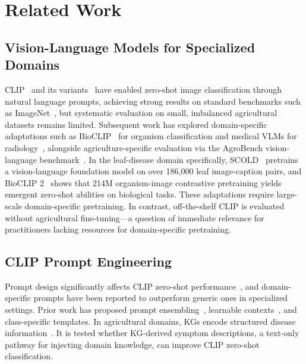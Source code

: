 \documentclass[10pt,a4paper]{article}
\begin{document}
\section{Related Work}
\label{sec:related}

\subsection{Vision-Language Models for Specialized Domains}

CLIP~\cite{radford2021learning} and its variants~\cite{cherti2023reproducible,zhai2023sigmoid} have enabled zero-shot image classification through natural language prompts, achieving strong results on standard benchmarks such as ImageNet~\cite{deng2009imagenet}, but systematic evaluation on small, imbalanced agricultural datasets remains limited.
Subsequent work has explored domain-specific adaptations such as BioCLIP~\cite{stevens2024bioclip} for organism classification and medical VLMs for radiology~\cite{huang2021gloria}, alongside agriculture-specific evaluation via the AgroBench vision-language benchmark~\cite{shinoda2025agrobench}.
In the leaf-disease domain specifically, SCOLD~\cite{scold2025} pretrains a vision-language foundation model on over 186,000 leaf image-caption pairs, and BioCLIP 2~\cite{bioclip2} shows that 214M organism-image contrastive pretraining yields emergent zero-shot abilities on biological tasks.
These adaptations require large-scale domain-specific pretraining.
In contrast, off-the-shelf CLIP is evaluated without agricultural fine-tuning---a question of immediate relevance for practitioners lacking resources for domain-specific pretraining.

\subsection{CLIP Prompt Engineering}

Prompt design significantly affects CLIP zero-shot performance~\cite{liu2025finegrained,zhou2022learning}, and domain-specific prompts have been reported to outperform generic ones in specialized settings.
Prior work has proposed prompt ensembling~\cite{radford2021learning}, learnable contexts~\cite{zhou2022learning}, and class-specific templates.
In agricultural domains, KGs encode structured disease information~\cite{cropdpkg2025}.
It is tested whether KG-derived symptom descriptions, a text-only pathway for injecting domain knowledge, can improve CLIP zero-shot classification.
\end{document}
